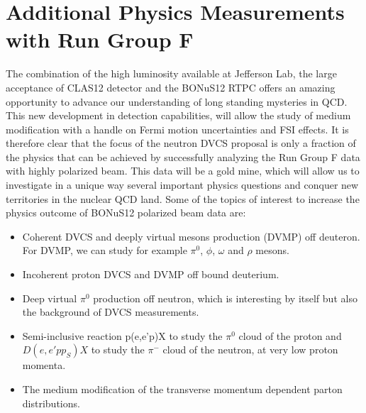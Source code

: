  \chapter{Additional Physics Measurements with Run Group F}
 \label{chap:additional}

The combination of the high luminosity available at Jefferson Lab, the large 
acceptance of CLAS12 detector and the BONuS12 RTPC offers an amazing 
opportunity to advance our understanding of long standing mysteries in QCD.  
This new development in detection capabilities, will allow the study of medium 
modification with a handle on Fermi motion uncertainties and FSI effects. It is 
therefore clear that the focus of the neutron DVCS proposal is only a fraction 
of the physics that can be achieved by successfully analyzing the Run Group F 
data with highly polarized beam. This data will be a gold mine, which will 
allow us to investigate in a unique way several important physics questions and 
conquer new territories in the nuclear QCD land. Some of the topics of interest 
to increase the physics outcome of BONuS12 polarized beam data are:

\begin{itemize}
\item Coherent DVCS and deeply virtual mesons production (DVMP) off deuteron.  
   For DVMP, we can study for example $\pi^0$, $\phi$, $\omega$ and $\rho$ 
      mesons.

\item Incoherent proton DVCS and DVMP off bound deuterium.

\item Deep virtual $\pi^0$ production off neutron, which is interesting by 
   itself but also the background of DVCS measurements.
\item Semi-inclusive reaction p(e,e'p)X to study the $\pi^0$ cloud of the 
   proton and $D(e, e' pp_S)X$ to study the $\pi^-$ cloud of the neutron, at 
      very low proton momenta.
\item The medium modification of the transverse momentum dependent parton 
   distributions.
\end{itemize}

